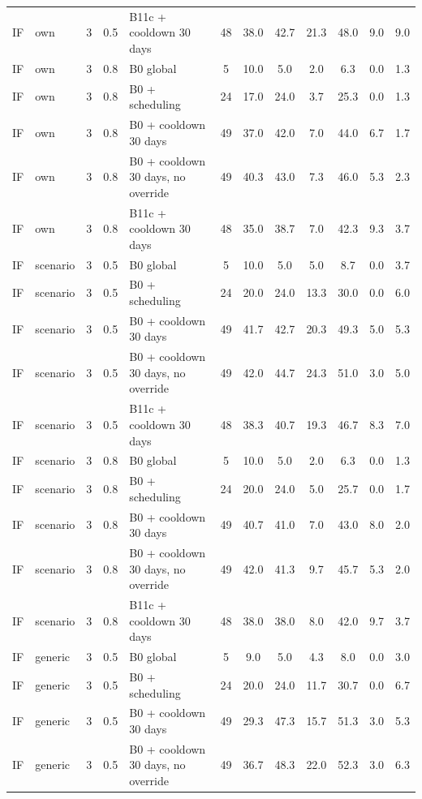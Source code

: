 \documentclass[10pt,onecolumn,letterpaper]{article}
\begin{document}
\begin{longtable}{lllllccccccc}
IF & own & 3 & 0.5 & B11c + cooldown 30 days & 48 & 38.0 & 42.7 & 21.3 & 48.0 & 9.0 & 9.0 \\
IF & own & 3 & 0.8 & B0 global & 5 & 10.0 & 5.0 & 2.0 & 6.3 & 0.0 & 1.3 \\
IF & own & 3 & 0.8 & B0 + scheduling & 24 & 17.0 & 24.0 & 3.7 & 25.3 & 0.0 & 1.3 \\
IF & own & 3 & 0.8 & B0 + cooldown 30 days & 49 & 37.0 & 42.0 & 7.0 & 44.0 & 6.7 & 1.7 \\
IF & own & 3 & 0.8 & B0 + cooldown 30 days, no override & 49 & 40.3 & 43.0 & 7.3 & 46.0 & 5.3 & 2.3 \\
IF & own & 3 & 0.8 & B11c + cooldown 30 days & 48 & 35.0 & 38.7 & 7.0 & 42.3 & 9.3 & 3.7 \\
IF & scenario & 3 & 0.5 & B0 global & 5 & 10.0 & 5.0 & 5.0 & 8.7 & 0.0 & 3.7 \\
IF & scenario & 3 & 0.5 & B0 + scheduling & 24 & 20.0 & 24.0 & 13.3 & 30.0 & 0.0 & 6.0 \\
IF & scenario & 3 & 0.5 & B0 + cooldown 30 days & 49 & 41.7 & 42.7 & 20.3 & 49.3 & 5.0 & 5.3 \\
IF & scenario & 3 & 0.5 & B0 + cooldown 30 days, no override & 49 & 42.0 & 44.7 & 24.3 & 51.0 & 3.0 & 5.0 \\
IF & scenario & 3 & 0.5 & B11c + cooldown 30 days & 48 & 38.3 & 40.7 & 19.3 & 46.7 & 8.3 & 7.0 \\
IF & scenario & 3 & 0.8 & B0 global & 5 & 10.0 & 5.0 & 2.0 & 6.3 & 0.0 & 1.3 \\
IF & scenario & 3 & 0.8 & B0 + scheduling & 24 & 20.0 & 24.0 & 5.0 & 25.7 & 0.0 & 1.7 \\
IF & scenario & 3 & 0.8 & B0 + cooldown 30 days & 49 & 40.7 & 41.0 & 7.0 & 43.0 & 8.0 & 2.0 \\
IF & scenario & 3 & 0.8 & B0 + cooldown 30 days, no override & 49 & 42.0 & 41.3 & 9.7 & 45.7 & 5.3 & 2.0 \\
IF & scenario & 3 & 0.8 & B11c + cooldown 30 days & 48 & 38.0 & 38.0 & 8.0 & 42.0 & 9.7 & 3.7 \\
IF & generic & 3 & 0.5 & B0 global & 5 & 9.0 & 5.0 & 4.3 & 8.0 & 0.0 & 3.0 \\
IF & generic & 3 & 0.5 & B0 + scheduling & 24 & 20.0 & 24.0 & 11.7 & 30.7 & 0.0 & 6.7 \\
IF & generic & 3 & 0.5 & B0 + cooldown 30 days & 49 & 29.3 & 47.3 & 15.7 & 51.3 & 3.0 & 5.3 \\
IF & generic & 3 & 0.5 & B0 + cooldown 30 days, no override & 49 & 36.7 & 48.3 & 22.0 & 52.3 & 3.0 & 6.3 \\

\end{longtable}
\end{document}
